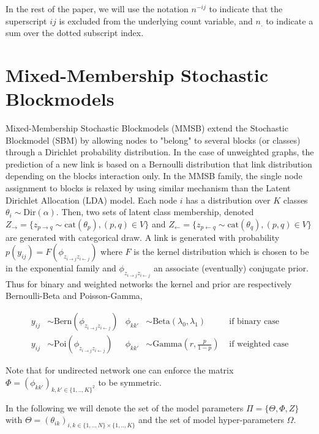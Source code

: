 In the rest of the paper, we will use the notation $n^{-ij}$ to indicate that the superscript $ij$ is excluded from the underlying count variable, and $n_{\bm{.}}$ to indicate a sum over the dotted subscript index.


\section{Mixed-Membership Stochastic Blockmodels}

Mixed-Membership Stochastic Blockmodels (MMSB) extend the Stochastic Blockmodel (SBM) \cite{airoldi2009mixed} by allowing nodes to "belong" to several blocks (or classes) through a Dirichlet probability distribution. In the case of unweighted graphs, the prediction of a new link is based on a Bernoulli distribution that link distribution depending on the blocks interaction only. %
In the MMSB family, the single node assignment to blocks is relaxed by using similar mechanism than the Latent Dirichlet Allocation (LDA) model. Each node $i$ has a distribution over $K$ classes $\theta_i \sim \textrm{Dir}(\alpha)$. Then, two sets of latent class membership, denoted $Z_\rightarrow = \{z_{p\rightarrow q} \sim \textrm{cat}(\theta_p),  (p,q) \in V\}$ and $Z_\leftarrow = \{z_{p\leftarrow q} \sim \textrm{cat}(\theta_q),  (p,q) \in V\}$ are generated with categorical draw. A link is generated with probability $p(y_{ij}) = F(\phi_{z_{i \rightarrow j}z_{i \leftarrow j}})$ where $F$ is the kernel distribution which is chosen to be in the exponential family and $\phi_{z_{i \rightarrow j}z_{i \leftarrow j}}$ an associate (eventually) conjugate prior. Thus for binary and weighted networks the kernel and prior are respectively Bernoulli-Beta and Poisson-Gamma,

\begin{align*} \label{eq:generative}
y_{ij} &\sim \textrm{Bern}(\phi_{z_{i \rightarrow j}z_{i \leftarrow j}}) & \phi_{kk'} &\sim \textrm{Beta}(\lambda_0, \lambda_1) & \textrm{ if binary case} \\
y_{ij} &\sim \textrm{Poi}(\phi_{z_{i \rightarrow j}z_{i \leftarrow j}}) &  \phi_{kk'} &\sim \textrm{Gamma}(r, \frac{p}{1-p})    & \textrm{ if weighted case} 
\end{align*}

Note that for undirected network one can enforce the matrix $\Phi = (\phi_{kk'})_{k,k' \in \{1,..,K\}^2}$ to be symmetric.

In the following we will denote the set of the model parameters $\Pi = \{ \Theta, \Phi, Z \}$ with $\Theta = (\theta_{ik})_{i,k \in \{1,..,N\}\times \{1,..,K\}}$ and the set of model hyper-parameters $\Omega$.

